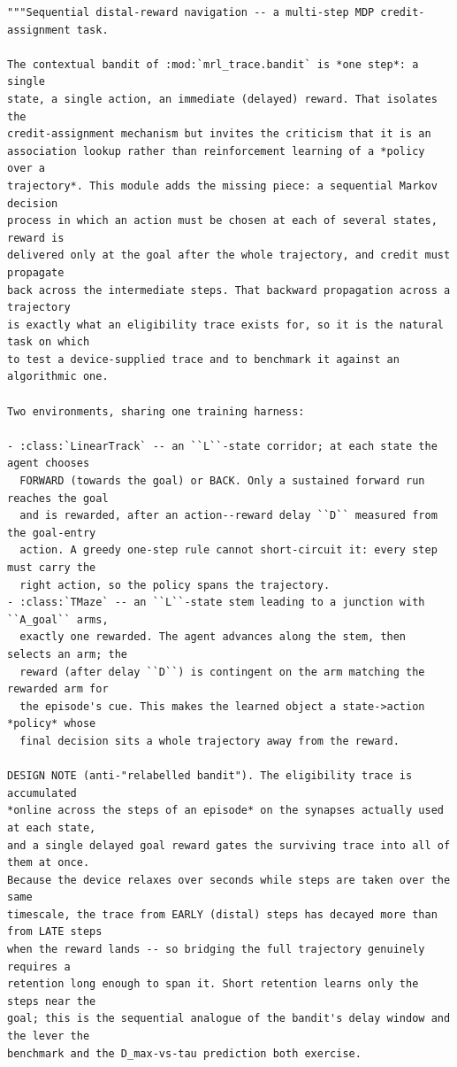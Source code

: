 \begin{lstlisting}[caption={mrl\_trace/maze.py},label={lst:siox-src-maze}]
"""Sequential distal-reward navigation -- a multi-step MDP credit-assignment task.

The contextual bandit of :mod:`mrl_trace.bandit` is *one step*: a single
state, a single action, an immediate (delayed) reward. That isolates the
credit-assignment mechanism but invites the criticism that it is an
association lookup rather than reinforcement learning of a *policy over a
trajectory*. This module adds the missing piece: a sequential Markov decision
process in which an action must be chosen at each of several states, reward is
delivered only at the goal after the whole trajectory, and credit must propagate
back across the intermediate steps. That backward propagation across a trajectory
is exactly what an eligibility trace exists for, so it is the natural task on which
to test a device-supplied trace and to benchmark it against an algorithmic one.

Two environments, sharing one training harness:

- :class:`LinearTrack` -- an ``L``-state corridor; at each state the agent chooses
  FORWARD (towards the goal) or BACK. Only a sustained forward run reaches the goal
  and is rewarded, after an action--reward delay ``D`` measured from the goal-entry
  action. A greedy one-step rule cannot short-circuit it: every step must carry the
  right action, so the policy spans the trajectory.
- :class:`TMaze` -- an ``L``-state stem leading to a junction with ``A_goal`` arms,
  exactly one rewarded. The agent advances along the stem, then selects an arm; the
  reward (after delay ``D``) is contingent on the arm matching the rewarded arm for
  the episode's cue. This makes the learned object a state->action *policy* whose
  final decision sits a whole trajectory away from the reward.

DESIGN NOTE (anti-"relabelled bandit"). The eligibility trace is accumulated
*online across the steps of an episode* on the synapses actually used at each state,
and a single delayed goal reward gates the surviving trace into all of them at once.
Because the device relaxes over seconds while steps are taken over the same
timescale, the trace from EARLY (distal) steps has decayed more than from LATE steps
when the reward lands -- so bridging the full trajectory genuinely requires a
retention long enough to span it. Short retention learns only the steps near the
goal; this is the sequential analogue of the bandit's delay window and the lever the
benchmark and the D_max-vs-tau prediction both exercise.


\end{lstlisting}
